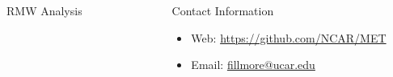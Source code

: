 \documentclass[final]{beamer}
\newlength{\sepwid}
\newlength{\onecolwid}
\newlength{\twocolwid}
\begin{document}
\begin{frame}[t]
\begin{columns}[t]
\begin{column}{\twocolwid}
\begin{columns}[t,totalwidth=\twocolwid]
\begin{column}{\onecolwid}
\begin{block}{RMW Analysis}
\end{block}


\end{column} %

\end{columns} %

\end{column} %

\begin{column}{\sepwid}\end{column} %

\begin{column}{\onecolwid} %


\begin{block}

\nocite{*} %
\small{
\vspace{0.75in}}

\end{block}



\begin{alertblock}{Contact Information}

\begin{itemize}
\item Web: \href{https://github.com/NCAR/MET}{https://github.com/NCAR/MET}
\item Email: \href{mailto:fillmore@ucar.edu}{fillmore@ucar.edu}
\end{itemize}

\end{alertblock}


\end{column}
\end{columns}
\end{frame}
\end{document}
